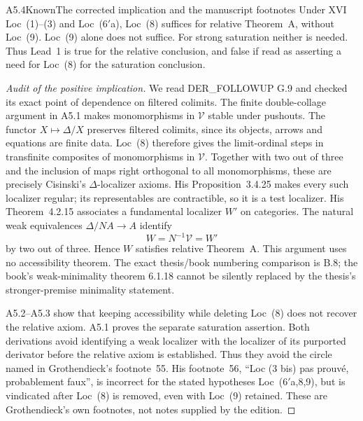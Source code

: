 \begin{claim}{A5.4}{Known}{The corrected implication and the manuscript footnotes}
\label{A54}
Under XVI Loc~(1)--(3) and Loc~($6'$a), Loc~(8) suffices for relative
Theorem~A, without Loc~(9).  Loc~(9) alone does not suffice.
For strong saturation neither is needed.  Thus Lead~1 is true for the
relative conclusion, and false if read as asserting a need for Loc~(8)
for the saturation conclusion.
\end{claim}
\begin{proof}[Audit of the positive implication]
We read DER\_FOLLOWUP G.9 and checked its exact point of dependence on
filtered colimits.  The finite double-collage argument in A5.1 makes
monomorphisms in $\mathcal V$ stable under pushouts.  The functor
$X\mapsto\Delta/X$ preserves filtered colimits, since its objects,
arrows and equations are finite data.  Loc~(8) therefore gives the
limit-ordinal steps in transfinite composites of monomorphisms in
$\mathcal V$.  Together with two out of three and the inclusion of
maps right orthogonal to all monomorphisms, these are precisely
Cisinski's $\Delta$-localizer axioms.  His Proposition~3.4.25 makes
every such localizer regular; its representables are contractible,
so it is a test localizer.  His Theorem~4.2.15 associates a fundamental
localizer $W'$ on categories.  The natural weak equivalences
$\Delta/NA\to A$ identify
\[
       W=N^{-1}\mathcal V=W'
\]
by two out of three.  Hence $W$ satisfies relative Theorem~A.
This argument uses no accessibility theorem.  The exact thesis/book
numbering comparison is B.8; the book's weak-minimality theorem
6.1.18 cannot be silently replaced by the thesis's stronger-premise
minimality statement.

A5.2--A5.3 show that keeping accessibility while deleting
Loc~(8) does not recover the relative axiom.  A5.1 proves the separate
saturation assertion.  Both derivations avoid identifying a weak
localizer with the localizer of its purported derivator before the
relative axiom is established.  Thus they avoid the circle named in
Grothendieck's footnote~55.  His footnote~56, ``Loc (3 bis) pas prouv\'e,
probablement faux'', is incorrect for the stated hypotheses
Loc~($6'$a,8,9), but is vindicated after Loc~(8) is removed, even with
Loc~(9) retained.  These are Grothendieck's own footnotes, not notes
supplied by the edition.
\end{proof}
